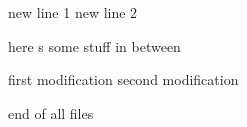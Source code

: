 new line 1
new line 2


here s some stuff in between

first modification
second modification

end of all files
